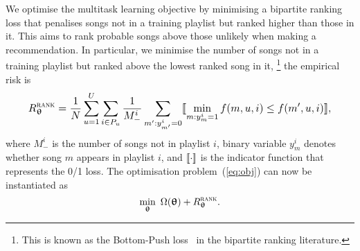 %
%
We optimise the multitask learning objective by minimising a bipartite ranking loss 
that penalises songs not in a training playlist but ranked higher than those in it.
This aims to rank probable songs above those unlikely when making a recommendation.
In particular, we minimise the number of songs not in a training playlist but ranked above the lowest ranked song in it, %
\footnote{This is known as the Bottom-Push loss~\cite{rudin2009p} in the bipartite ranking literature.}
\ie the %
empirical risk is
\begin{equation}
\label{eq:bprisk}
\resizebox{.908\linewidth}{!}{$\displaystyle
R_{\upthetabm}^{\textsc{rank}} = \frac{1}{N} \sum_{u=1}^U \sum_{i \in P_u} \frac{1}{M_-^i} \sum_{m': y_{m'}^i = 0} 
\llb \min_{m: y_m^i = 1} f(m, u, i) \le f(m', u, i) \rrb,
$}
\end{equation}
where $M_-^i$ is the number of songs not in playlist $i$,
binary variable $y_m^i$ denotes whether song $m$ appears in playlist $i$,
and $\llbracket \cdot \rrbracket$ is the indicator function that represents the 0/1 loss.
%
The optimisation problem~(\ref{eq:obj}) can now be instantiated as 
\begin{equation}
\label{eq:obj_rank}
\min_{\bm{\uptheta}} \ \Omega({\bm{\uptheta}}) + R_{{\bm{\uptheta}}}^{\textsc{rank}}.
\end{equation}

